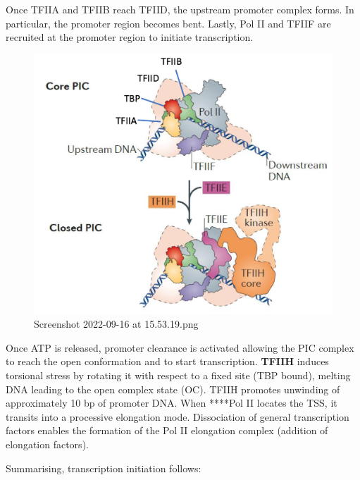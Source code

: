 Once TFIIA and TFIIB reach TFIID, the upstream promoter complex forms. In particular, the promoter region becomes bent. Lastly, Pol II and TFIIF are recruited at the promoter region to initiate transcription.

\begin{figure}
\centering
\includegraphics[width=\textwidth]{../_resources/Screenshot_2022-09-16_at_15-53-19.png}
\caption{Screenshot 2022-09-16 at 15.53.19.png}
\end{figure}

Once ATP is released, promoter clearance is activated allowing the PIC complex to reach the open conformation and to start transcription. \textbf{TFIIH} induces torsional stress by rotating it with respect to a fixed site (TBP bound), melting DNA leading to the open complex state (OC). TFIIH promotes unwinding of approximately 10 bp of promoter DNA. When ****Pol II locates the TSS, it transits into a processive elongation mode. Dissociation of general transcription factors enables the formation of the Pol II elongation complex (addition of elongation factors).

Summarising, transcription initiation follows:

